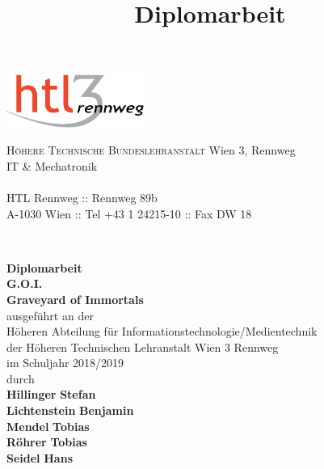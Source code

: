 \documentclass[
    headings=optiontotocandhead,%
    twoside,
    numbers=noenddot,%
    toc=flat, %
    12pt, %
    titlepage, %
    parskip=full, %
    listof=totoc, %
    listof=flat, %
    numbers=noenddot, %
    bibliography=totoc, %
    a4paper,DIV=14,
    BCOR=15mm,
]{scrbook}
\begin{document}
\newcommand{\kapitelautor}{}


\frontmatter %
\title{Diplomarbeit}
\begin{titlepage}
\begin{minipage}[b]{1\columnwidth}
\parbox[b]{50mm}{\includegraphics[width=45mm]{HTL3RLogoRGB}}
\hfill
\parbox[b]{130mm}{\footnotesize \textsc{Höhere Technische Bundeslehranstalt} Wien 3, Rennweg\\
IT \& Mechatronik\\
\\
HTL Rennweg :: Rennweg 89b\\
A-1030 Wien :: Tel +43 1 24215-10 :: Fax DW 18
}\\
\mbox{}
\end{minipage}

\vspace{1cm}


\begin{center}
\textbf{\LARGE{}Diplomarbeit}{\large{}}\\
{\large{}\vspace{15mm}
 }\textbf{\large{}G.O.I.}\\
\textbf{\large{}Graveyard of Immortals}\\
 \vspace{15mm}
 ausgeführt an der\\
 Höheren Abteilung für Informationstechnologie/Medientechnik\\
 der Höheren Technischen Lehranstalt Wien 3 Rennweg\\
 \vspace{1cm}
 im Schuljahr 2018/2019\\
 \vspace{1cm}
 durch\\
 \vspace{0.5cm}
\textbf{\large{}Hillinger} \textbf{\large{}Stefan}\\
\textbf{\large{}Lichtenstein} \textbf{\large{}Benjamin}\\
\textbf{\large{}Mendel} \textbf{\large{}Tobias}\\
\textbf{\large{}Röhrer} \textbf{\large{}Tobias}\\
\textbf{\large{}Seidel} \textbf{\large{}Hans}\\


\end{center}
\end{titlepage}
\end{document}
